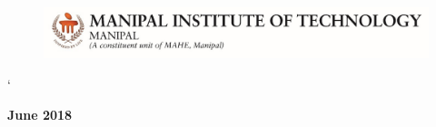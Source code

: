 \documentclass[a4paper,12pt]{report}
\begin{document}
\begin{titlepage}
\begin{center}
\end{center}


\begin{figure}[h]
  \begin{center}
	\includegraphics[scale=1]{MITLogo}
	\end{center}
	\end{figure}`
	\begin{center}
	\textbf{June 2018}
	\end{center}
\end{titlepage}

\newpage





\listoftables
\pagebreak
{}
\listoffigures
\tableofcontents









\renewcommand{\bibname}{References} %


\end{document}
